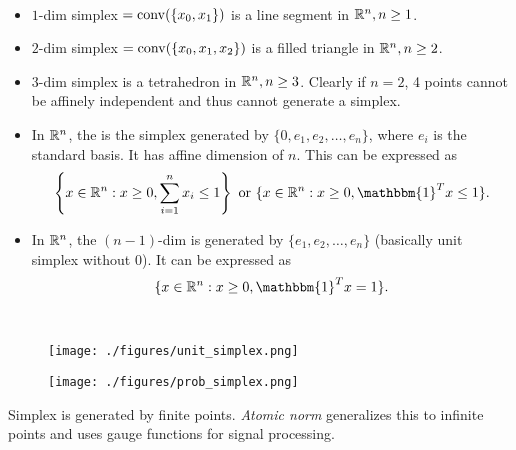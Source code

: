 \documentclass[class=article,crop=false]{standalone}
\begin{document}
\begin{eg}
	~\begin{itemize}
		\item $ 1$-dim simplex $ = \operatorname{conv}( \{x_0,x_1\} )$ is a line segment in $ \mathbb{R}^{n}, n\geq 1$.
		\item $ 2$-dim simplex  $ = \operatorname{conv}( \{x_0,x_1,x_2\} )$ is a filled triangle in $ \mathbb{R}^{n}, n\geq 2$.
		\item $ 3$-dim simplex is a tetrahedron in $ \mathbb{R}^{n}, n\geq 3$. Clearly if $ n=2$, 4 points cannot be affinely independent and thus cannot generate a simplex.
		\item In $ \mathbb{R}^{n}$, the  is the simplex generated by $ \{0, e_1, e_2, \ldots, e_n\} $, where $ e_i$ is the standard basis. It has affine dimension of $ n$. This can be expressed as
			\[
				\left\{x \in \rr^{n} : x \geq 0, \sum_{ i= 1}^{ n} x_i \leq 1\right\} \text{ or } \{x \in \rr^{n}: x \geq 0, \mathbbm{1}^{T} x \leq 1\} 
			.\]
		\item In $ \mathbb{R}^{n}$, the $ (n-1)$-dim   is generated by $ \{e_1, e_2,\ldots,e_n\} $ (basically unit simplex without 0). It can be expressed as
		\[
			\{x \in \rr^{n}: x\geq 0, \mathbbm{1}^{T} x = 1\} 	
		.\] 
	\end{itemize}
\end{eg}
~\begin{figure}[H]
	\centering
	\texttt{[image: ./figures/unit\_simplex.png]}
\end{figure}
\begin{figure}[H]
	\centering
	\texttt{[image: ./figures/prob\_simplex.png]}
\end{figure}

\begin{remark}
	Simplex is generated by finite points. \emph{Atomic norm} generalizes this to infinite points and uses gauge functions for signal processing.
\end{remark}

\newpage
\end{document}
